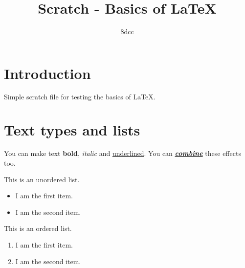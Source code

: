 \documentclass{article}
\title{Scratch - Basics of \LaTeX}
\author{8dcc}
\date{}
\begin{document}
\maketitle
\newpage

\tableofcontents
\newpage

\section{Introduction}

Simple scratch file for testing the basics of \LaTeX.

\section{Text types and lists}

You can make text \textbf{bold}, \textit{italic} and \underline{underlined}.
You can \underline{\textbf{\textit{combine}}} these effects too.

This is an unordered list.

\begin{itemize}
  \item I am the first item.
  \item I am the second item.
\end{itemize}

This is an ordered list.

\begin{enumerate}
  \item I am the first item.
  \item I am the second item.
\end{enumerate}
\end{document}
